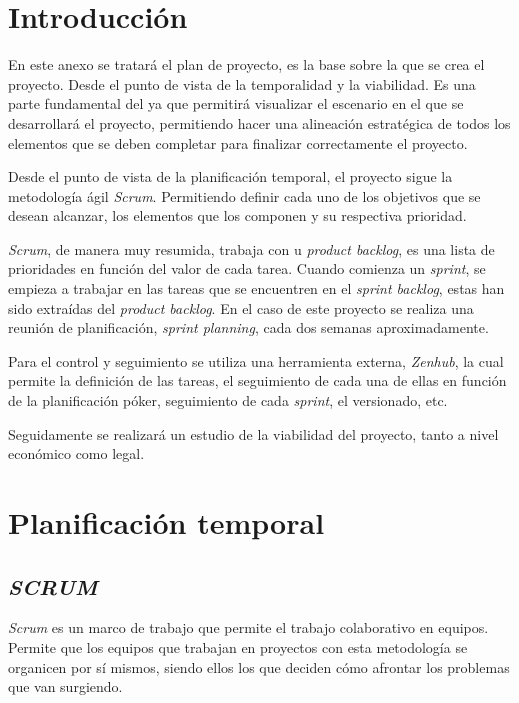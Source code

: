 \section{Introducción}
En este anexo se tratará el plan de proyecto, es la base sobre la que se crea el proyecto. Desde el punto de vista de la temporalidad y la viabilidad. Es una parte fundamental del ya que permitirá visualizar el escenario en el que se desarrollará el proyecto, permitiendo hacer una alineación estratégica de todos los elementos que se deben completar para finalizar correctamente el proyecto.

Desde el punto de vista de la planificación temporal, el proyecto sigue la metodología ágil \textit{Scrum}. Permitiendo definir cada uno de los objetivos que se desean alcanzar, los elementos que los componen y su respectiva prioridad.

\textit{Scrum}, de manera muy resumida, trabaja con u \textit{product backlog}, es una lista de prioridades en función del valor de cada tarea. Cuando comienza un \textit{sprint}, se empieza a trabajar en las tareas que se encuentren en el \textit{sprint backlog}, estas han sido extraídas del \textit{product backlog}. En el caso de este proyecto se realiza una reunión de planificación, \textit{sprint planning}, cada dos semanas aproximadamente.

Para el control y seguimiento se utiliza una herramienta externa, \textit{Zenhub}, la cual permite la definición de las tareas, el seguimiento de cada una de ellas en función de la planificación póker, seguimiento de cada \textit{sprint}, el versionado, etc.

Seguidamente se realizará un estudio de la viabilidad del proyecto, tanto a nivel económico como legal.
\newpage

\section{Planificación temporal}
\subsection{\textit{SCRUM}}
\textit{Scrum} es un marco de trabajo que permite el trabajo colaborativo en equipos. Permite que los equipos que trabajan en proyectos con esta metodología se organicen por sí mismos, siendo ellos los que deciden cómo afrontar los problemas que van surgiendo. 

